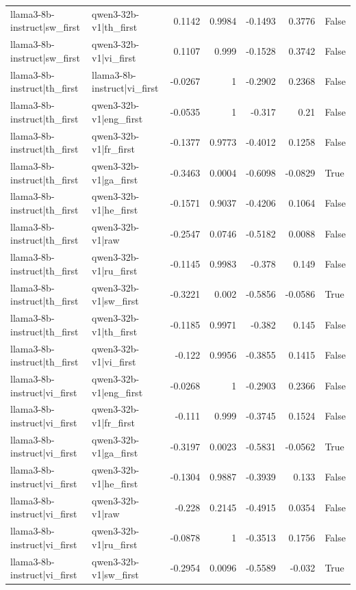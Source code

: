 \begin{table}
\begin{tabular}{l l r r r r l}
llama3-8b-instruct|sw_first & qwen3-32b-v1|th_first & 0.1142 & 0.9984 & -0.1493 & 0.3776 & False \\
llama3-8b-instruct|sw_first & qwen3-32b-v1|vi_first & 0.1107 & 0.999 & -0.1528 & 0.3742 & False \\
llama3-8b-instruct|th_first & llama3-8b-instruct|vi_first & -0.0267 & 1 & -0.2902 & 0.2368 & False \\
llama3-8b-instruct|th_first & qwen3-32b-v1|eng_first & -0.0535 & 1 & -0.317 & 0.21 & False \\
llama3-8b-instruct|th_first & qwen3-32b-v1|fr_first & -0.1377 & 0.9773 & -0.4012 & 0.1258 & False \\
llama3-8b-instruct|th_first & qwen3-32b-v1|ga_first & -0.3463 & 0.0004 & -0.6098 & -0.0829 & True \\
llama3-8b-instruct|th_first & qwen3-32b-v1|he_first & -0.1571 & 0.9037 & -0.4206 & 0.1064 & False \\
llama3-8b-instruct|th_first & qwen3-32b-v1|raw & -0.2547 & 0.0746 & -0.5182 & 0.0088 & False \\
llama3-8b-instruct|th_first & qwen3-32b-v1|ru_first & -0.1145 & 0.9983 & -0.378 & 0.149 & False \\
llama3-8b-instruct|th_first & qwen3-32b-v1|sw_first & -0.3221 & 0.002 & -0.5856 & -0.0586 & True \\
llama3-8b-instruct|th_first & qwen3-32b-v1|th_first & -0.1185 & 0.9971 & -0.382 & 0.145 & False \\
llama3-8b-instruct|th_first & qwen3-32b-v1|vi_first & -0.122 & 0.9956 & -0.3855 & 0.1415 & False \\
llama3-8b-instruct|vi_first & qwen3-32b-v1|eng_first & -0.0268 & 1 & -0.2903 & 0.2366 & False \\
llama3-8b-instruct|vi_first & qwen3-32b-v1|fr_first & -0.111 & 0.999 & -0.3745 & 0.1524 & False \\
llama3-8b-instruct|vi_first & qwen3-32b-v1|ga_first & -0.3197 & 0.0023 & -0.5831 & -0.0562 & True \\
llama3-8b-instruct|vi_first & qwen3-32b-v1|he_first & -0.1304 & 0.9887 & -0.3939 & 0.133 & False \\
llama3-8b-instruct|vi_first & qwen3-32b-v1|raw & -0.228 & 0.2145 & -0.4915 & 0.0354 & False \\
llama3-8b-instruct|vi_first & qwen3-32b-v1|ru_first & -0.0878 & 1 & -0.3513 & 0.1756 & False \\
llama3-8b-instruct|vi_first & qwen3-32b-v1|sw_first & -0.2954 & 0.0096 & -0.5589 & -0.032 & True \\

\end{tabular}
\end{table}
